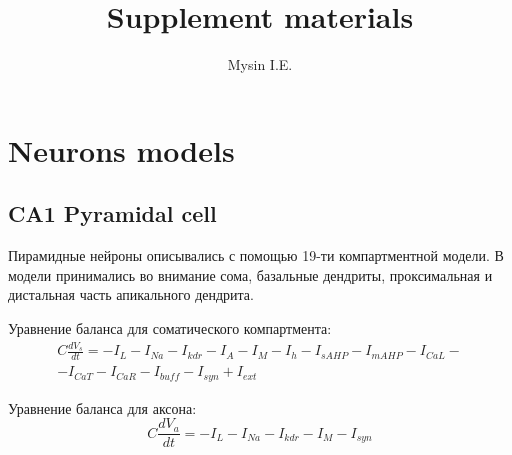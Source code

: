 \documentclass[12pt]{article}
\title{Supplement materials}
\author{Mysin I.E.}
\date{}
\begin{document}
\maketitle

\section{Neurons models}
\subsection{CA1 Pyramidal cell}
Пирамидные нейроны описывались с помощью 19-ти компартментной модели. В модели принимались во внимание сома, базальные дендриты, проксимальная и дистальная часть апикального дендрита. \par
Уравнение баланса для соматического компартмента:
\begin{eqnarray}
C\frac{dV_s}{dt}=-I_L-I_{Na}-I_{kdr}-I_A-I_M-I_h-I_{sAHP}-I_{mAHP}-I_{CaL}- \nonumber \\ -I_{CaT}-I_{CaR}-I_{buff}-I_{syn} + I_{ext}
\end{eqnarray}

Уравнение баланса для аксона:
\begin{equation}
C\frac{dV_a}{dt}=-I_L-I_{Na}-I_{kdr}-I_M-I_{syn}
\end{equation}
\end{document}
